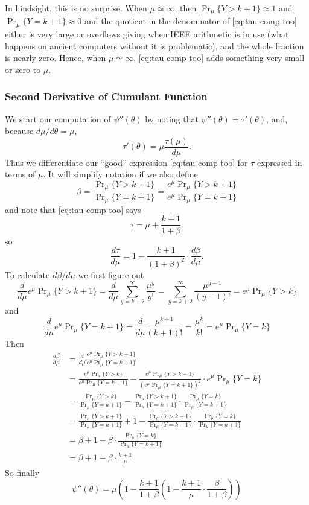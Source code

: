 \documentclass[11pt]{article}
\newcommand{\Prmu}{\Pr\nolimits_\mu}
\begin{document}
In hindsight, this is no surprise.  When $\mu \simeq \infty$, then
$\Prmu \{ Y > k + 1 \} \approx 1$ and $\Prmu \{ Y = k + 1 \} \approx 0$
and the quotient in the denominator of \eqref{eq:tau-comp-too} either is very large or overflows
giving \verb@Inf@ when IEEE arithmetic is in use (what happens on ancient computers without it
is problematic), and the whole fraction is nearly zero.  Hence, when $\mu \simeq \infty$,
\eqref{eq:tau-comp-too} adds something very small or zero to $\mu$.

\subsubsection{Second Derivative of Cumulant Function}

We start our computation of $\psi''(\theta)$ by noting that $\psi''(\theta) = \tau'(\theta)$,
and, because $d \mu / d \theta = \mu$,
$$
   \tau'(\theta) = \mu \frac{\tau(\mu)}{d \mu}.
$$
Thus we differentiate our ``good'' expression \eqref{eq:tau-comp-too} for $\tau$
expressed in terms of $\mu$.  It will simplify notation if we also define
$$
   \beta
   =
   \frac{\Prmu \{ Y > k + 1 \}}{\Prmu \{ Y = k + 1 \}}
   =
   \frac{e^\mu \Prmu \{ Y > k + 1 \}}{e^\mu \Prmu \{ Y = k + 1 \}}
$$
and note that \eqref{eq:tau-comp-too} says
$$
   \tau = \mu + \frac{k + 1}{1 + \beta}.
$$
so
$$
   \frac{d \tau}{d \mu} = 1 - \frac{k + 1}{(1 + \beta)^2} \cdot \frac{d \beta}{d \mu}.
$$
To calculate $d \beta / d \mu$ we first figure out
$$
   \frac{d}{d \mu} e^\mu \Prmu \{ Y > k + 1 \}
   =
   \frac{d}{d \mu} \sum_{y = k + 2}^\infty \frac{\mu^y}{y !}
   =
   \sum_{y = k + 2}^\infty \frac{\mu^{y - 1}}{(y - 1) !}
   =
   e^\mu \Prmu \{ Y > k \}
$$
and
$$
   \frac{d}{d \mu} e^\mu \Prmu \{ Y = k + 1 \}
   =
   \frac{d}{d \mu} \frac{\mu^{k + 1}}{(k + 1) !}
   =
   \frac{\mu^k}{k !}
   =
   e^\mu \Prmu \{ Y = k \}
$$
Then
\begin{align*}
   \frac{d \beta}{d \mu}
   & =
   \frac{d}{d \mu} \frac{e^\mu \Prmu \{ Y > k + 1 \}}{e^\mu \Prmu \{ Y = k + 1 \}}
   \\
   & =
   \frac{e^\mu \Prmu \{ Y > k \}}{e^\mu \Prmu \{ Y = k + 1 \}}
   -
   \frac{e^\mu \Prmu \{ Y > k + 1 \}}{\left( e^\mu \Prmu \{ Y = k + 1 \} \right)^2}
   \cdot
   e^\mu \Prmu \{ Y = k \}
   \\
   & =
   \frac{\Prmu \{ Y > k \}}{\Prmu \{ Y = k + 1 \}}
   -
   \frac{\Prmu \{ Y > k + 1 \}}{\Prmu \{ Y = k + 1 \}}
   \cdot
   \frac{\Prmu \{ Y = k \}}{\Prmu \{ Y = k + 1 \}}
   \\
   & =
   \frac{\Prmu \{ Y > k + 1 \}}{\Prmu \{ Y = k + 1 \}} + 1
   -
   \frac{\Prmu \{ Y > k + 1 \}}{\Prmu \{ Y = k + 1 \}}
   \cdot
   \frac{\Prmu \{ Y = k \}}{\Prmu \{ Y = k + 1 \}}
   \\
   & =
   \beta + 1
   -
   \beta \cdot
   \frac{\Prmu \{ Y = k \} }{\Prmu \{ Y = k + 1 \}}
   \\
   & =
   \beta + 1 - \beta \cdot \frac{k + 1}{\mu}
\end{align*}
So finally
\begin{equation} \label{eq:psi-double-prime-comp}
   \psi''(\theta)
   =
   \mu \left( 1 - \frac{k + 1}{1 + \beta}
   \left( 1 - \frac{k + 1}{\mu} \cdot \frac{\beta}{1 + \beta} \right) \right)
\end{equation}
\end{document}
